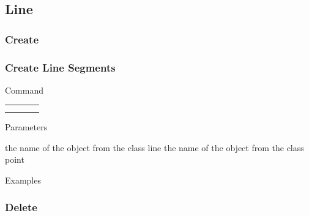 \documentclass[9pt]{beamer}
\begin{document}
\subsection{Line}

\subsubsection{Create}

\begin{frame}[t] \frametitle{Create Line Segments}

	\begin{block}{Command} 
		\begin{tabularx}{\textwidth}{@{}l@{}l@{}l@{}R}
			 &
			  	 &
			  	 & \InstrItem \\
			 &
				 &
				 & \InstrItem
		\end{tabularx}
	\end{block}

	\begin{block}{Parameters} \begin{itemize}
		   the name of the object from the class line
		   the name of the object from the class point
	\end{itemize} \end{block}

	\begin{block}{Examples}
	\end{block}

\end{frame}

\subsubsection{Delete}
\end{document}
